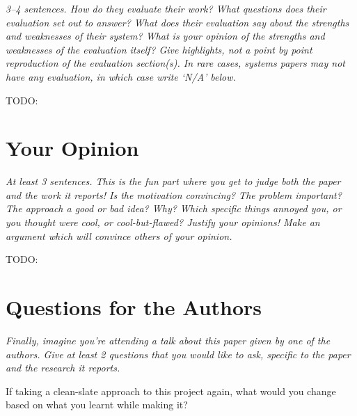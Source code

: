\documentclass[11pt]{article}
\begin{document}
\textsl{3--4 sentences. How do they evaluate their work? What questions does
their evaluation set out to answer? What does their evaluation say about the
strengths and weaknesses of their system? What is your opinion of the strengths
and weaknesses of the evaluation itself? Give highlights, not a point by point
reproduction of the evaluation section(s). In rare cases, systems papers may
not have any evaluation, in which case write `N/A' below.}

TODO:


\section*{Your Opinion}

\textsl{At least 3 sentences. This is the fun part where you get to judge both
the paper and the work it reports! Is the motivation convincing? The problem
important? The approach a good or bad idea? Why? Which specific things annoyed
you, or you thought were cool, or cool-but-flawed? Justify your opinions! Make
an argument which will convince others of your opinion.}

TODO:


\section*{Questions for the Authors}

\textsl{Finally, imagine you're attending a talk about this paper given by one
of the authors. Give at least 2 questions that you would like to ask, specific
to the paper and the research it reports.}

If taking a clean-slate approach to this project again, what would you change
based on what you learnt while making it?




\end{document}
